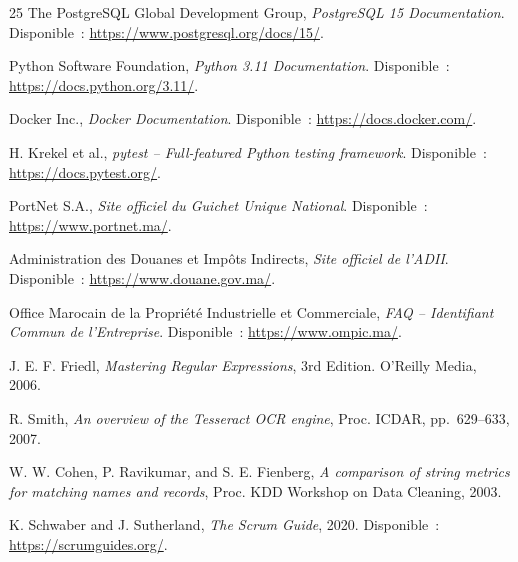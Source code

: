 \begin{thebibliography}{25}
The PostgreSQL Global Development Group, \textit{PostgreSQL 15 Documentation}. Disponible~: \url{https://www.postgresql.org/docs/15/}.

Python Software Foundation, \textit{Python 3.11 Documentation}. Disponible~: \url{https://docs.python.org/3.11/}.

Docker Inc., \textit{Docker Documentation}. Disponible~: \url{https://docs.docker.com/}.

H. Krekel et al., \textit{pytest -- Full-featured Python testing framework}. Disponible~: \url{https://docs.pytest.org/}.

PortNet S.A., \textit{Site officiel du Guichet Unique National}. Disponible~: \url{https://www.portnet.ma/}.

Administration des Douanes et Imp\^{o}ts Indirects, \textit{Site officiel de l'ADII}. Disponible~: \url{https://www.douane.gov.ma/}.

Office Marocain de la Propri\'{e}t\'{e} Industrielle et Commerciale, \textit{FAQ -- Identifiant Commun de l'Entreprise}. Disponible~: \url{https://www.ompic.ma/}.

J. E. F. Friedl, \textit{Mastering Regular Expressions}, 3rd Edition. O'Reilly Media, 2006.

R. Smith, \textit{An overview of the Tesseract OCR engine}, Proc. ICDAR, pp.~629--633, 2007.

W. W. Cohen, P. Ravikumar, and S. E. Fienberg, \textit{A comparison of string metrics for matching names and records}, Proc. KDD Workshop on Data Cleaning, 2003.

K. Schwaber and J. Sutherland, \textit{The Scrum Guide}, 2020. Disponible~: \url{https://scrumguides.org/}.

\end{thebibliography}
